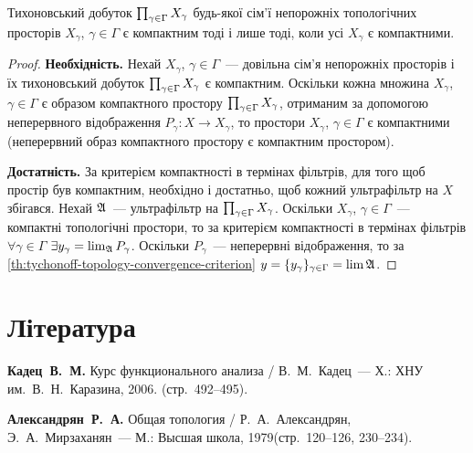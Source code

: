\begin{theorem}
    Тихоновський добуток $\CartesianProduct{X}$ будь-якої сім'ї непорожніх топологічних просторів $X_\gamma$, $\gamma \in \Gamma$ є компактним тоді і лише тоді, коли усі $X_\gamma$ є компактними.
\end{theorem}

\begin{proof}
    \textbf{Необхідність.} Нехай $X_\gamma$, $\gamma \in \Gamma$~--- довільна сім'я непорожніх просторів і їх тихоновський добуток $\CartesianProduct{X}$ є компактним. Оскільки кожна множина $X_\gamma$, $\gamma \in \Gamma$ є образом компактного простору $\CartesianProduct{X}$, отриманим за допомогою неперервного відображення $P_\gamma: X \to X_\gamma$, то простори $X_\gamma$, $\gamma \in \Gamma$ є компактними (неперервний образ компактного простору є компактним простором).

    \textbf{Достатність.} За критерієм компактності в термінах фільтрів, для того щоб простір був компактним, необхідно і достатньо, щоб кожний ультрафільтр на $X$ збігався. Нехай $\frak A$~--- ультрафільтр на $\CartesianProduct{X}$. Оскільки $X_\gamma$, $\gamma \in \Gamma$~--- компактні топологічні простори, то за критерієм компактності в термінах фільтрів $\forall \gamma \in \Gamma$ $\exists y_\gamma = \lim_{\frak A} P_\gamma$. Оскільки $P_\gamma$~--- неперервні відображення, то за \cref{th:tychonoff-topology-convergence-criterion} $y = \{y_\gamma\}_{\gamma \in \Gamma} = \lim \frak A$.
\end{proof}

\section{Література}

\begin{enumerate}[label={[\arabic*]}]
\item \textbf{Кадец~В.~М.}
Курс функционального анализа /
В.~М.~Кадец~---
Х.: ХНУ им.~В.~Н.~Каразина, 2006. (стр.~492--495).
\item \textbf{Александрян~Р.~А.}
Общая топология /
Р.~А.~Александрян, Э.~А.~Мирзаханян~---
М.: Высшая школа, 1979(стр.~120--126, 230--234).
\end{enumerate}
